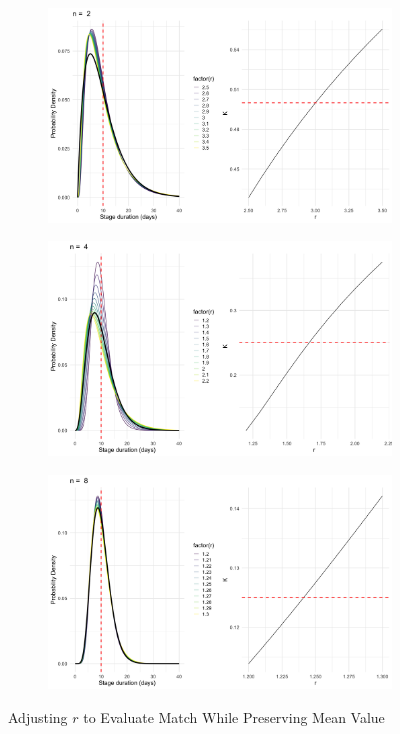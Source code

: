 \documentclass[12pt]{article}
\begin{document}
\begin{figure}[h!]
    \centering
 
    \begin{subfigure}{0.6\linewidth}
       \includegraphics[width=\linewidth]{4.1(n=2).png}
    \end{subfigure}

    \begin{subfigure}{0.6\linewidth}
       \includegraphics[width=\linewidth]{4.1(n=4).png}
    \end{subfigure}

    \begin{subfigure}{0.6\linewidth}
        \includegraphics[width=\linewidth]{4.1(n=8).png}
     \end{subfigure}
 
    \caption{Adjusting $r$ to Evaluate Match While Preserving Mean Value}
    \label{fig:all_plots}
 \end{figure}
 
\end{document}
